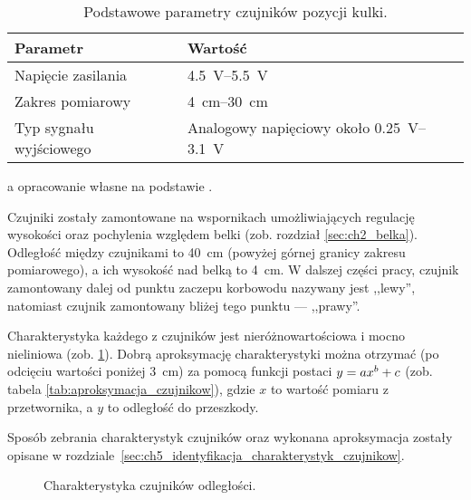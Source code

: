 \begin{table}[h]
    \centering
    \begin{threeparttable}
        \caption{Podstawowe parametry czujników pozycji kulki.}
        \label{tab:parametry_czujnikow_Sharp}
        
        \begin{tabularx}{0.75\textwidth}{l | l}
            \toprule
            Parametr & Wartość \\
            \midrule
            Napięcie zasilania & \SIrange{4,5}{5,5}{\volt} \\
            Zakres pomiarowy & \SIrange{4}{30}{\centi\meter} \\
            Typ sygnału wyjściowego & Analogowy napięciowy około \SIrange{0,25}{3,1}{\volt} \\
            \bottomrule
        \end{tabularx}
        
        \begin{tablenotes}
            \footnotesize
            \item[a] opracowanie własne na podstawie \cite{SHARP_MANUAL}.
        \end{tablenotes}
    \end{threeparttable}
\end{table}

Czujniki zostały zamontowane na wspornikach umożliwiających regulację wysokości oraz pochylenia względem belki (zob. rozdział \ref{sec:ch2_belka}). Odległość między czujnikami to \SI{40}{\centi\meter} (powyżej górnej granicy zakresu pomiarowego), a ich wysokość nad belką to \SI{4}{\centi\meter}. W dalszej części pracy, czujnik zamontowany dalej od punktu zaczepu korbowodu nazywany jest ,,lewy'', natomiast czujnik zamontowany bliżej tego punktu --- ,,prawy''.

Charakterystyka każdego z czujników jest nieróżnowartościowa i mocno nieliniowa (zob. \cref{fig:charakterystyka_czujnikow}). Dobrą aproksymację charakterystyki można otrzymać (po odcięciu wartości poniżej \SI{3}{\centi\meter}) za pomocą funkcji postaci $y =\nobreak a x ^ b + c$ (zob. tabela \ref{tab:aproksymacja_czujnikow}), gdzie $x$ to wartość pomiaru z przetwornika, a $y$ to odległość do przeszkody.

Sposób zebrania charakterystyk czujników oraz wykonana aproksymacja zostały opisane w rozdziale~\ref{sec:ch5_identyfikacja_charakterystyk_czujnikow}.

\begin{figure}[h]
    \centering
    
    \caption{Charakterystyka czujników odległości.}
    \label{fig:charakterystyka_czujnikow}
\end{figure}

